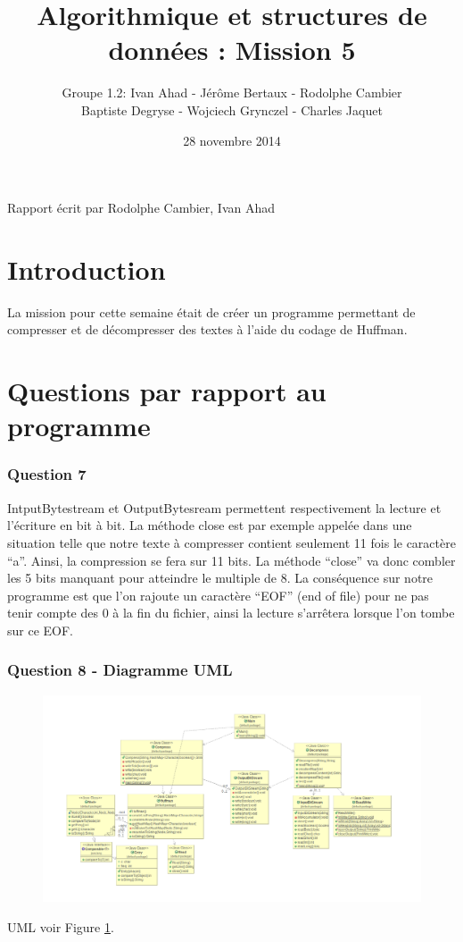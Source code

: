 \documentclass[a4paper]{article}
\title{Algorithmique et structures de données : Mission 5}
\date{28 novembre 2014}
\author{Groupe 1.2: Ivan Ahad - Jérôme Bertaux - Rodolphe Cambier \\ 
	Baptiste Degryse - Wojciech Grynczel - Charles Jaquet}
\begin{document}
\maketitle


Rapport écrit par Rodolphe Cambier, Ivan Ahad
\section*{Introduction}
La mission pour cette semaine était de créer un programme permettant de compresser et de décompresser des textes à l'aide du codage de Huffman. 

\section*{Questions par rapport au programme}

\subsubsection*{Question 7}

IntputBytestream et OutputBytesream permettent respectivement la lecture et l’écriture en bit à bit.
La méthode close est par exemple appelée dans une situation telle que notre texte à compresser contient seulement 11 fois le caractère “a”. Ainsi, la compression se fera sur 11 bits. La méthode “close” va donc combler les 5 bits manquant pour atteindre le multiple de 8. La conséquence sur notre programme est que l’on rajoute un caractère “EOF” (end of file) pour ne pas tenir compte des 0 à la fin du fichier, ainsi la lecture s’arrêtera lorsque l’on tombe sur ce EOF. 


\subsubsection*{Question 8 - Diagramme UML}

\begin{figure}
\centering
\includegraphics[scale=0.4]{UML}
\label{uml}
\end{figure}
UML voir Figure \ref{uml}.
\end{document}
